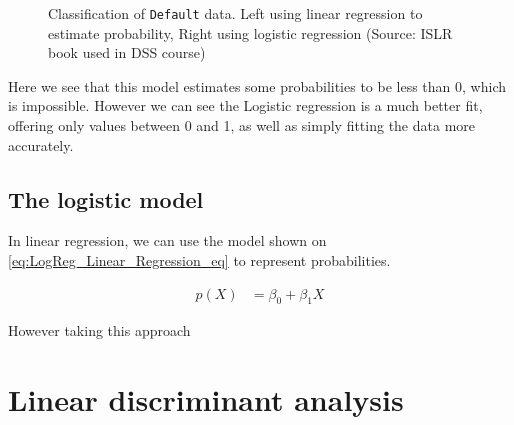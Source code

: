 \begin{figure}[H]
	\centering
	\caption{Classification of \texttt{Default} data. Left using linear regression to estimate probability, Right using logistic regression (Source: ISLR book\cite{book_2015} used in DSS course)}
	\label{fig:LinReg_vs_LogReg}
\end{figure}

Here we see that this model estimates some probabilities to be less than 0, which is impossible. However we can see the Logistic regression is a much better fit, offering only values between 0 and 1, as well as simply fitting the data more accurately.

\subsection{The logistic model}

In linear regression, we can use the model shown on \cref{eq:LogReg_Linear_Regression_eq} to represent probabilities.

\begin{equation} \label{eq:LogReg_Linear_Regression_eq}
\begin{split}
p(X) & = \beta_0 + \beta_1 X
\end{split}
\end{equation} 

However taking this approach

\section{Linear discriminant analysis}